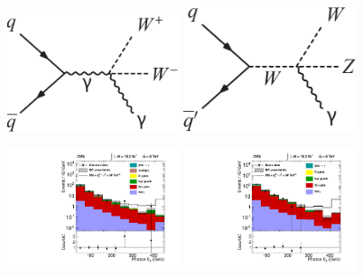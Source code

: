 \begin{figure}[p]
    \centering
    \includegraphics[width=0.45\textwidth]{figures/ss-inclboson-triboson-wvg-diagram1.pdf}
    \includegraphics[width=0.45\textwidth]{figures/ss-inclboson-triboson-wvg-diagram2.pdf}
    \caption{}
    \label{fig:ss-inclboson-triboson-wvg-diagrams}
\end{figure}
\begin{figure}[p]
    \centering
    \includegraphics[width=0.45\textwidth]{figures/ss-inclboson-triboson-wvg-ele-cms8tev.pdf}
    \includegraphics[width=0.45\textwidth]{figures/ss-inclboson-triboson-wvg-mu-cms8tev.pdf}
    \caption{}
    \label{fig:ss-inclboson-triboson-wvg-cms8tev}
\end{figure}
